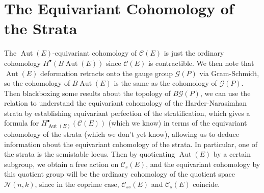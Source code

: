 \documentclass[psamsfonts, 12pt]{amsart}
\theoremstyle{definition}
\theoremstyle{remark}
\DeclareMathOperator{\Aut}{Aut}
\begin{document}
\section{The Equivariant Cohomology of the Strata}
%
The $\Aut(E)$-equivariant cohomology of $\mathscr{C}(E)$ is just
the ordinary cohomology $H^\bullet(B\Aut(E))$ since
$\mathscr{C}(E)$ is contractible. We then note that $\Aut(E)$ deformation retracts
onto the gauge group $\mathscr{G}(P)$ via Gram-Schmidt, so the cohomology of
$B\Aut(E)$ is the same as the cohomology of $\mathscr{G}(P)$. Then blackboxing some
results about the topology of $B\mathscr{G}(P)$, we can use the relation to understand
the equivariant cohomology of the Harder-Narasimhan strata by establishing equivariant
perfection of the stratification, which gives a formula for
$H^\bullet_{\Aut(E)}(\mathscr{C}(E))$ (which we know) in terms of the equivariant
cohomology of the strata (which we don't yet know), allowing us to deduce information
about the equivariant cohomology of the strata. In particular, one of the strata is the
semistable locus. Then by quotienting $\Aut(E)$ by a certain subgroup, we obtain a free
action on $\mathscr{C}_s(E)$, and the equivariant cohomology by this quotient group
will be the ordinary cohomology of the quotient space $\mathcal{N}(n,k)$, since in the
coprime case, $\mathscr{C}_{ss}(E)$ and $\mathscr{C}_s(E)$ coincide. \\
\end{document}
